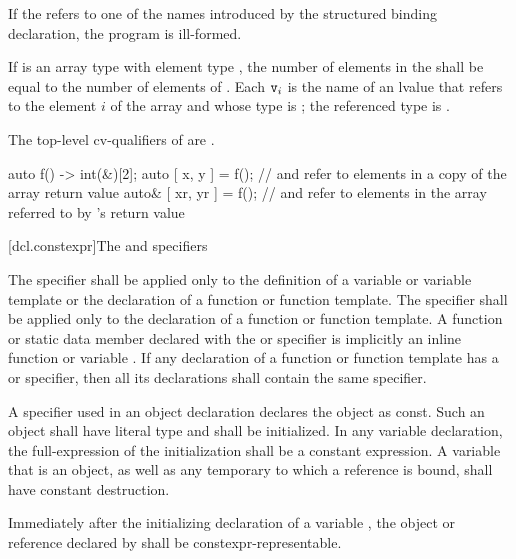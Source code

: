 \documentclass{wg21}
\begin{document}
\pnum
If the  refers to
one of the names introduced by the structured binding declaration,
the program is ill-formed.

\pnum
If  is an array type with element type , the number
of elements in the  shall be equal to the
number of elements of . Each $\texttt{v}_i$ is the name of an
lvalue that refers to the element $i$ of the array and whose type
is ; the referenced type is .
\begin{note}
    The top-level cv-qualifiers of  are \cv.
\end{note}
\begin{example}
    \begin{codeblock}
        auto f() -> int(&)[2];
        auto [ x, y ] = f();            //  and  refer to elements in a copy of the array return value
        auto& [ xr, yr ] = f();         //  and  refer to elements in the array referred to by 's return value
    \end{codeblock}
\end{example}


[dcl.constexpr]{The  and  specifiers}%

\pnum
The  specifier shall be applied only to
the definition of a variable or variable template or
the declaration of a function or function template.
The  specifier shall be applied only to
the declaration of a function or function template.
A function or static data member
declared with the  or  specifier
is implicitly an inline function or variable .
If any declaration of a function or function template has
a  or  specifier,
then all its declarations shall contain the same specifier.


\pnum
A  specifier used in an object declaration
declares the object as const.
Such an object
shall have literal type and
shall be initialized.
In any  variable declaration,
the full-expression of the initialization
shall be a constant expression.
A  variable that is an object,
as well as any temporary to which a  reference is bound,
shall have constant destruction.
\begin{addedblock}
Immediately after the initializing declaration of a  variable ,
the object or reference declared by  shall be constexpr-representable.
\end{addedblock}
\end{document}
